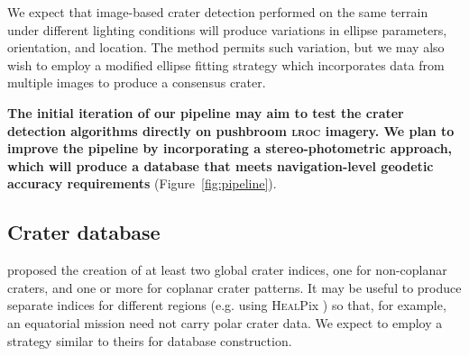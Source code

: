 \documentclass[12pt]{olfmemo}
\begin{document}
We expect that image-based crater detection performed on the same terrain under different lighting conditions will produce variations in ellipse parameters, orientation, and location. The \citet{Christian2020} method permits such variation, but we may also wish to employ a modified ellipse fitting strategy which incorporates data from multiple images to produce a consensus crater.

\textbf{The initial iteration of our pipeline may aim to test the crater detection algorithms directly on pushbroom \textsc{lroc} imagery. We plan to improve the pipeline by incorporating a stereo-photometric approach, which will produce a database that meets navigation-level geodetic accuracy requirements} (Figure~\ref{fig:pipeline}).


\subsection{Crater database}
\citet{Christian2020} proposed the creation of at least two global crater indices, one for non-coplanar craters, and one or more for coplanar crater patterns. It may be useful to produce separate indices for different regions (e.g. using \textsc{Heal}Pix \citep{Gorski2005}) so that, for example, an equatorial mission need not carry polar crater data. We expect to employ a strategy similar to theirs for database construction.

\end{document}
